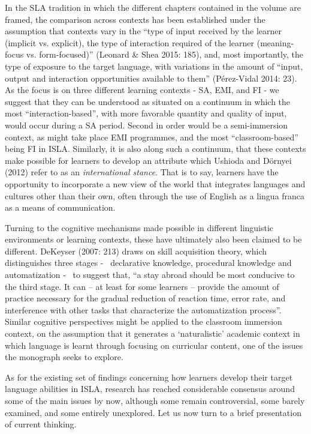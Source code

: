 \documentclass[12pt]{article}
\newenvironment{styleStandard}{\setlength\leftskip{0cm}\setlength\rightskip{0cm plus 1fil}\setlength\parindent{0cm}\setlength\parfillskip{0pt plus 1fil}\setlength\parskip{0in plus 1pt}\writerlistparindent\writerlistleftskip\leavevmode\normalfont\normalsize\writerlistlabel\ignorespaces}{\unskip\vspace{0.111in plus 0.0111in}\par}
\newcommand\writerlistleftskip{}
\newcommand\writerlistparindent{}
\newcommand\writerlistlabel{}
\begin{document}
\begin{styleStandard}
In the SLA tradition in which the different chapters contained in the volume are framed, the comparison across contexts has been established under the assumption that contexts vary in the “type of input received by the learner (implicit vs. explicit), the type of interaction required of the learner (meaning-focus vs. form-focused)” (Leonard \& Shea 2015: 185), and, most importantly, the type of exposure to the target language, with variations in the amount of “input, output and interaction opportunities available to them” (Pérez-Vidal 2014: 23). As the focus is on three different learning contexts - SA, EMI, and FI - we suggest that they can be understood as situated on a continuum in which the most “interaction-based”, with more favorable quantity and quality of input, would occur during a SA period. Second in order would be a semi-immersion context, as might take place EMI programmes, and the most “classroom-based” being FI in ISLA. Similarly, it is also along such a continuum, that these contexts make possible for learners to develop an attribute which Ushioda and Dörnyei (2012) refer to as an \textit{international stance}. That is to say, learners have the opportunity to incorporate a new view of the world that integrates languages and cultures other than their own, often through the use of English as a lingua franca as a means of communication.
\end{styleStandard}

\begin{styleStandard}
Turning to the cognitive mechanisms made possible in different linguistic environments or learning contexts, these have ultimately also been claimed to be different. DeKeyser (2007: 213) draws on skill acquisition theory, which distinguishes three stages - \ declarative knowledge, procedural knowledge and automatization - \ to suggest that, “a stay abroad should be most conducive to the third stage. It can – at least for some learners – provide the amount of practice necessary for the gradual reduction of reaction time, error rate, and interference with other tasks that characterize the automatization process”. Similar cognitive perspectives might be applied to the classroom immersion context, on the assumption that it generates a ‘naturalistic’ academic context in which language is learnt through focusing on curricular content, one of the issues the monograph seeks to explore. 
\end{styleStandard}

\begin{styleStandard}
As for the existing set of findings concerning how learners develop their target language abilities in ISLA, research has reached considerable consensus around some of the main issues by now, although some remain controversial, some barely examined, and some entirely unexplored. Let us now turn to a brief presentation of current thinking. \ 
\end{styleStandard}
\end{document}
